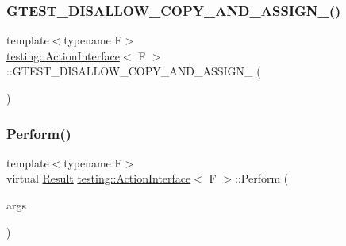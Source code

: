 \subsubsection{\texorpdfstring{G\+T\+E\+S\+T\+\_\+\+D\+I\+S\+A\+L\+L\+O\+W\+\_\+\+C\+O\+P\+Y\+\_\+\+A\+N\+D\+\_\+\+A\+S\+S\+I\+G\+N\+\_\+()}{GTEST\_DISALLOW\_COPY\_AND\_ASSIGN\_()}}
{\footnotesize\ttfamily template$<$typename F$>$ \\
\hyperlink{classtesting_1_1ActionInterface}{testing\+::\+Action\+Interface}$<$ F $>$\+::G\+T\+E\+S\+T\+\_\+\+D\+I\+S\+A\+L\+L\+O\+W\+\_\+\+C\+O\+P\+Y\+\_\+\+A\+N\+D\+\_\+\+A\+S\+S\+I\+G\+N\+\_\+ (\begin{DoxyParamCaption}\item[{\hyperlink{classtesting_1_1ActionInterface}{Action\+Interface}$<$ F $>$}]{ }\end{DoxyParamCaption})\hspace{0.3cm}{\ttfamily [private]}}

\mbox{\label{classtesting_1_1ActionInterface_a20f8624fcea1786f2992b358760422a0}} 
\subsubsection{\texorpdfstring{Perform()}{Perform()}}
{\footnotesize\ttfamily template$<$typename F$>$ \\
virtual \hyperlink{classtesting_1_1ActionInterface_a7477de2fe3e4e01c59db698203acaee7}{Result} \hyperlink{classtesting_1_1ActionInterface}{testing\+::\+Action\+Interface}$<$ F $>$\+::Perform (\begin{DoxyParamCaption}\item[{const \hyperlink{classtesting_1_1ActionInterface_af72720d864da4d606629e83edc003511}{Argument\+Tuple} \&}]{args }\end{DoxyParamCaption})\hspace{0.3cm}{\ttfamily [pure virtual]}}



